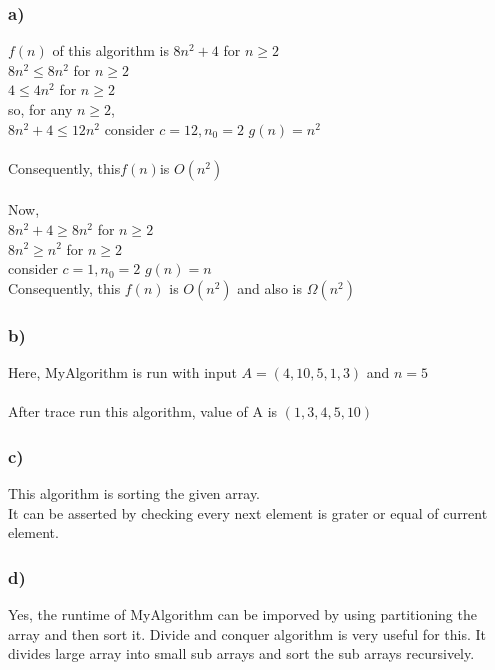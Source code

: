 \documentclass[10pt, a4paper]{article}
\begin{document}
	\subsubsection*{a)}
	{$f(n)$ of this algorithm is $8n^2+4$ for $n \geq 2$ \\}
	{$ 8n^2 \leq 8n^2$ for $ n \geq 2 $ \\}
	{$ 4 \leq 4n^2$ for $ n \geq 2 $ \\}
	{so, for any $n \geq 2$,\\}
	{$8n^2+4 \leq 12n^2 $ \rightarrow consider \hspace{.1cm} $c=12, n_0=2$ \rightarrow $ g(n) = n^2$ \\ \\}
	{Consequently, this\hspace{.1cm}$f(n)$\hspace{.1cm}is\hspace{.1cm} $O(n^2)$}
	\\\\
	{Now,\\}
	{$8n^2+4 \geq 8n^2 $ for $ n \geq 2$}\\
	{$8n^2 \geq n^2 $ for $ n \geq 2$}\\
	{\rightarrow consider $ c = 1, n_0 = 2 $ \rightarrow $ g(n) = n$}\\
	{Consequently, this $ f(n) $ is $ O(n^2) $ and \hspace{.1cm} also \hspace{.1cm} is $ \Omega(n^2)$}
	
	\subsubsection*{b)}
	{Here, MyAlgorithm is run with input $ A = (4,10,5,1,3) $ and $ n = 5$ \\ \\}
	{After trace run this algorithm, value of A is $ (1,3,4,5,10) $ }
	\subsubsection*{c)}
	{This algorithm is sorting the given array.}\\
	{It can be asserted by checking every next element is grater or equal of current element.}
	
	
	\subsubsection*{d)}
	{Yes, the runtime of MyAlgorithm can be imporved by using partitioning the array and then sort it. Divide and conquer algorithm is very useful for this. It divides large array into small sub arrays and sort the sub arrays recursively.}
\end{document}
